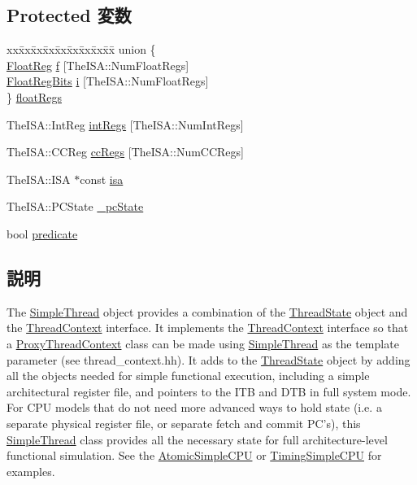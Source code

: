 \subsection*{Protected 変数}
\begin{DoxyCompactItemize}
\item 
\begin{tabbing}
xx\=xx\=xx\=xx\=xx\=xx\=xx\=xx\=xx\=\kill
union \{\\
\>\hyperlink{classSimpleThread_a75484259f1855aabc8d74c6eb1cfe186}{FloatReg} \hyperlink{classSimpleThread_a1ad2ddcae8ed0b6b5f1807294a6093e7}{f} \mbox{[}TheISA::NumFloatRegs\mbox{]}\\
\>\hyperlink{classSimpleThread_aab5eeae86499f9bfe15ef79360eccc64}{FloatRegBits} \hyperlink{classSimpleThread_a2dbb1d94eafced2e977e763f9254a549}{i} \mbox{[}TheISA::NumFloatRegs\mbox{]}\\
\} \hyperlink{classSimpleThread_a3dfbf30c655c5ae58763d7b1b5321501}{floatRegs}\\

\end{tabbing}\item 
TheISA::IntReg \hyperlink{classSimpleThread_a60193e9fd43c9cb3bec8505a0b25e3b1}{intRegs} \mbox{[}TheISA::NumIntRegs\mbox{]}
\item 
TheISA::CCReg \hyperlink{classSimpleThread_a0e0d321ede8414ee0cd5e6f93ff51dc2}{ccRegs} \mbox{[}TheISA::NumCCRegs\mbox{]}
\item 
TheISA::ISA $\ast$const \hyperlink{classSimpleThread_a8634f828e98f5175e8838b3c99532ba5}{isa}
\item 
TheISA::PCState \hyperlink{classSimpleThread_af217f22b3a4af1960222745e7e2b36c8}{\_\-pcState}
\item 
bool \hyperlink{classSimpleThread_afbb4c93008d44e809c143bbe5021d16e}{predicate}
\end{DoxyCompactItemize}


\subsection{説明}
The \hyperlink{classSimpleThread}{SimpleThread} object provides a combination of the \hyperlink{structThreadState}{ThreadState} object and the \hyperlink{classThreadContext}{ThreadContext} interface. It implements the \hyperlink{classThreadContext}{ThreadContext} interface so that a \hyperlink{classProxyThreadContext}{ProxyThreadContext} class can be made using \hyperlink{classSimpleThread}{SimpleThread} as the template parameter (see thread\_\-context.hh). It adds to the \hyperlink{structThreadState}{ThreadState} object by adding all the objects needed for simple functional execution, including a simple architectural register file, and pointers to the ITB and DTB in full system mode. For CPU models that do not need more advanced ways to hold state (i.e. a separate physical register file, or separate fetch and commit PC's), this \hyperlink{classSimpleThread}{SimpleThread} class provides all the necessary state for full architecture-\/level functional simulation. See the \hyperlink{classAtomicSimpleCPU}{AtomicSimpleCPU} or \hyperlink{classTimingSimpleCPU}{TimingSimpleCPU} for examples. 

